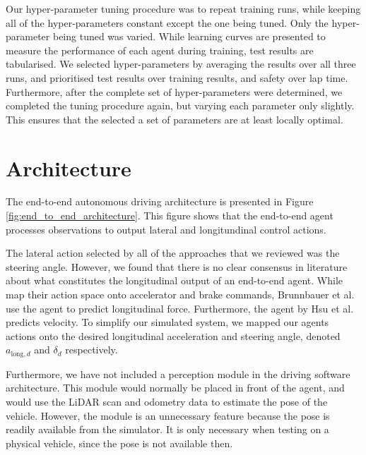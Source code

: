 Our hyper-parameter tuning procedure was to repeat training runs, while keeping all of the hyper-parameters constant except the one being tuned. 
Only the hyper-parameter being tuned was varied.
While learning curves are presented to measure the performance of each agent during training, test results are tabularised.
We selected hyper-parameters by averaging the results over all three runs, and prioritised test results over training results, and safety over lap time.
Furthermore, after the complete set of hyper-parameters were determined, we completed the tuning procedure again, but varying each parameter only slightly.
This ensures that the selected a set of parameters are at least locally optimal.



\section{Architecture}
The end-to-end autonomous driving architecture is presented in Figure \ref{fig:end_to_end_architecture}.
This figure shows that the end-to-end agent processes observations to output lateral and longitundinal control actions.

The lateral action selected by all of the approaches that we reviewed was the steering angle.
However, we found that there is no clear consensus in literature about what constitutes the longitudinal output of an end-to-end agent.
While \cite{Fuchs2021, Schwarting2021, Remonda2021} map their action space onto accelerator and brake commands, Brunnbauer et al.  \cite{Brunnbauer2021a} use the agent to predict longitudinal force. Furthermore, the agent by Hsu et al. \cite{hsu2022} predicts velocity. 
To simplify our simulated system, we mapped our agents actions onto the desired longitudinal acceleration and steering angle, denoted $a_{\text{long},d}$ and $\delta_d$ respectively.

Furthermore, we have not included a perception module in the driving software architecture.
This module would normally be placed in front of the agent, and would use the LiDAR scan and odometry data to estimate the pose of the vehicle.
However, the module is an unnecessary feature because the pose is readily available from the simulator.
It is only necessary when testing on a physical vehicle, since the pose is not available then.

